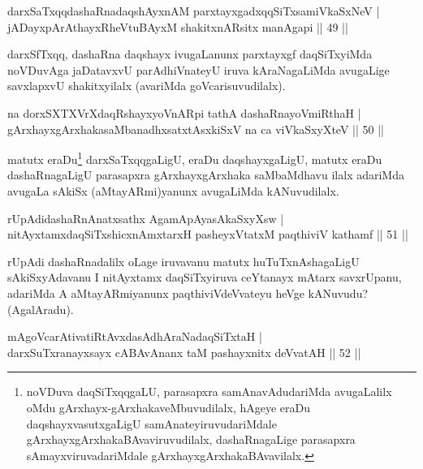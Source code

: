 
\begin{shl}
darxSaTxqqdashaRnadaqshAyxnAM parxtayxgadxqqSiTxsamiVkaSxNeV |\\
jADayxpArAthayxRheVtuBAyxM shakitxnARsitx manAgapi \hfill || 49 ||
\end{shl}

\begin{artha}
darxSfTxqq, dashaRna daqshayx ivugaLanunx parxtayxgf daqSiTxyiMda noVDuvAga jaDatavxvU parAdhiVnateyU iruva kAraNagaLiMda avugaLige savxlapxvU shakitxyilalx (avariMda goVcarisuvudilalx).
\end{artha}

\begin{shl}
na dorxSXTXVrXdaqRshayxyoVnARpi tathA dashaRnayoVmiRthaH |\\
gArxhayxgArxhakasaMbanadhxsatxtAsxkiSxV na ca viVkaSxyXteV \hfill || 50 ||
\end{shl}

\begin{artha}%
matutx eraDu\footnote[1]{noVDuva daqSiTxqqgaLU, parasapxra samAnavAdudariMda avugaLalilx oMdu gArxhayx-gArxhakaveMbuvudilalx, hAgeye eraDu daqshayxvasutxgaLigU samAnateyiruvudariMdale gArxhayxgArxhakaBAvaviruvudilalx, dashaRnagaLige parasapxra sAmayxviruvadariMdale gArxhayxgArxhakaBAvavilalx.} darxSaTxqqgaLigU, eraDu daqshayxgaLigU, matutx eraDu dashaRna\-gaLigU parasapxra gArxhayxgArxhaka saMbaMdhavu ilalx adariMda avugaLa sAkiSx (aMtayARmi)yanunx avugaLiMda kANuvudilalx.
\end{artha}

\begin{shl}
rUpAdidashaRnAnatxsathx AgamApAyasAkaSxyXsw |\\
nitAyxtamxdaqSiTxshicxnAmxtarxH pasheyxVtatxM paqthiviV kathamf \hfill || 51 ||
\end{shl}

\begin{artha}
rUpAdi dashaRnadalilx oLage iruvavanu matutx huTuTxnAshagaLigU sAkiSxyAda\-vanu I nitAyxtamx daqSiTxyiruva ceYtanayx mAtarx savxrUpanu, adariMda A aMtayARmiyanunx paqthiviVdeVvateyu heVge kANuvudu? (AgalAradu).
\end{artha}

\begin{shl}
mAgoVcarAtivatiRtAvxdasAdhAraNadaqSiTxtaH |\\
darxSuTxranayxsayx cABAvAnanx taM pashayxnitx deVvatAH \hfill || 52 ||
\end{shl}

